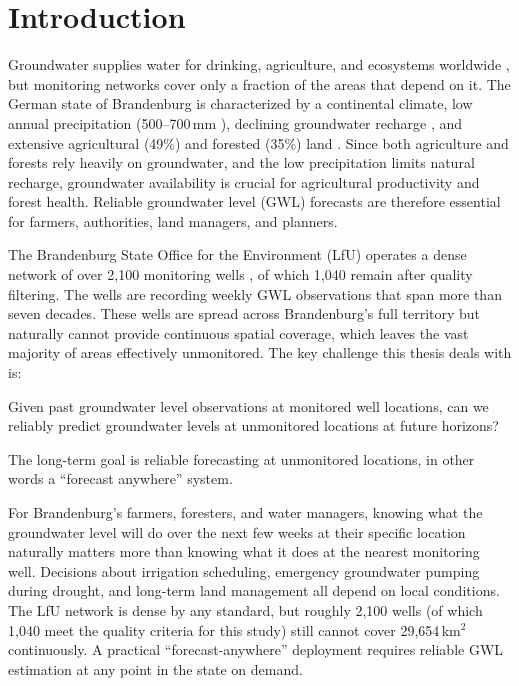 \chapter{Introduction}
\label{ch:introduction}

Groundwater supplies water for drinking, agriculture, and ecosystems worldwide \citep{taylor2013groundwater},
but monitoring networks cover only a fraction of the areas that depend on it.
The German state of Brandenburg is characterized by a continental climate,
low annual precipitation (500--700\,mm \citep{dwd2024klimaatlas}), declining groundwater recharge \citep{francke2025groundwater}, and
extensive agricultural (49\%) and forested (35\%) land \citep{statistikbb2023}. 
Since both agriculture and forests rely heavily on groundwater, and the low 
precipitation limits natural recharge, groundwater availability is
crucial for agricultural productivity and forest health. Reliable groundwater level (GWL) forecasts
are therefore essential for farmers, authorities, land managers, and planners.

The Brandenburg State Office for the Environment (LfU) operates a dense network of over 2{,}100
monitoring wells \citep{lfu2024styx}, of which 1{,}040 remain after quality filtering. The wells are recording weekly 
GWL observations that span more than seven decades. These wells are spread across 
Brandenburg's full territory but naturally cannot provide continuous spatial coverage,
which leaves the vast majority of areas effectively unmonitored. The key 
challenge this thesis deals with is:

\begin{tcolorbox}[researchquestion]
Given past groundwater level observations at monitored well locations,
can we reliably predict groundwater levels at unmonitored locations at future
horizons?
\end{tcolorbox}

The long-term goal is reliable forecasting at unmonitored locations, in other words
a ``forecast anywhere'' system.

For Brandenburg's farmers, foresters, and water managers, knowing what the groundwater level will do over the next few weeks at their specific location naturally matters more than knowing what it does at the nearest monitoring well. Decisions about irrigation scheduling, emergency groundwater pumping during drought, and long-term land management all depend on local conditions. The LfU network is dense by any standard, but roughly 2{,}100 wells (of which 1{,}040 meet the quality criteria for this study) still cannot cover 29{,}654\,km$^2$ continuously. A practical ``forecast-anywhere'' deployment requires reliable GWL estimation at any point in the state on demand.

